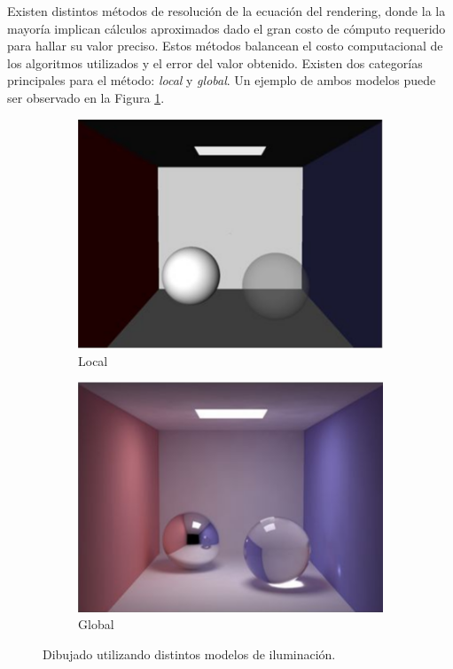 Existen distintos métodos de resolución de la ecuación del rendering, donde la la mayoría implican cálculos aproximados dado el gran costo de cómputo requerido para hallar su valor preciso. Estos métodos balancean el costo computacional de los algoritmos utilizados y el error del valor obtenido. Existen dos categorías principales para el método: \textit{local} y \textit{global}. Un ejemplo de ambos modelos puede ser observado en la Figura \ref{local-vs-global-img}.

\vspace{5mm}
\begin{figure}[h]
	\begin{subfigure}{0.5\textwidth}
		  	\centering
   		 	\includegraphics[width=1\linewidth]{assets/local}
   		 	\caption{Local}
   	\end{subfigure}
    \begin{subfigure}{0.5\textwidth}
    	\centering
    	\includegraphics[width=1\linewidth]{assets/global}
    	\caption{Global}
    \end{subfigure}
    \caption{Dibujado utilizando distintos modelos de iluminación.}
    \label{local-vs-global-img}
\end{figure}

